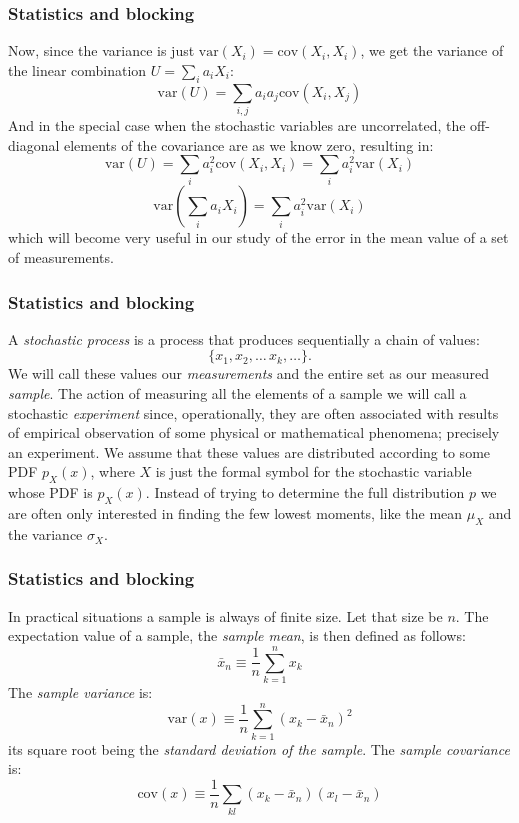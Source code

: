 \documentclass{beamer}
\begin{document}
\begin{frame}
\frametitle{Statistics and blocking}

\begin{block}{}
Now, since the variance is just $\mathrm{var}(X_i) = \mathrm{cov}(X_i, X_i)$, we get
the variance of the linear combination $U = \sum_i a_i X_i$:
\begin{equation}
\mathrm{var}(U) = \sum_{i,j}a_i a_j \mathrm{cov}(X_i, X_j)
\label{eq:variance_linear_combination}
\end{equation}
And in the special case when the stochastic variables are
uncorrelated, the off-diagonal elements of the covariance are as we
know zero, resulting in:
\[
\mathrm{var}(U) = \sum_i a_i^2 \mathrm{cov}(X_i, X_i) = \sum_i a_i^2 \mathrm{var}(X_i)
\]
\[
\mathrm{var}(\sum_i a_i X_i) = \sum_i a_i^2 \mathrm{var}(X_i)
\]
which will become very useful in our study of the error in the mean
value of a set of measurements.
\end{block}
\end{frame}

\begin{frame}
\frametitle{Statistics and blocking}

\begin{block}{}
A \emph{stochastic process} is a process that produces sequentially a
chain of values:
\[
\{x_1, x_2,\dots\,x_k,\dots\}.
\]
We will call these
values our \emph{measurements} and the entire set as our measured
\emph{sample}.  The action of measuring all the elements of a sample
we will call a stochastic \emph{experiment} since, operationally,
they are often associated with results of empirical observation of
some physical or mathematical phenomena; precisely an experiment. We
assume that these values are distributed according to some 
PDF $p_X^{\phantom X}(x)$, where $X$ is just the formal symbol for the
stochastic variable whose PDF is $p_X^{\phantom X}(x)$. Instead of
trying to determine the full distribution $p$ we are often only
interested in finding the few lowest moments, like the mean
$\mu_X^{\phantom X}$ and the variance $\sigma_X^{\phantom X}$.
\end{block}
\end{frame}

\begin{frame}
\frametitle{Statistics and blocking}

\begin{block}{}
In practical situations a sample is always of finite size. Let that
size be $n$. The expectation value of a sample, the \emph{sample mean}, is then defined as follows:
\[
\bar{x}_n \equiv \frac{1}{n}\sum_{k=1}^n x_k
\]
The \emph{sample variance} is:
\[
\mathrm{var}(x) \equiv \frac{1}{n}\sum_{k=1}^n (x_k - \bar{x}_n)^2
\]
its square root being the \emph{standard deviation of the sample}. The
\emph{sample covariance} is:
\[
\mathrm{cov}(x)\equiv\frac{1}{n}\sum_{kl}(x_k - \bar{x}_n)(x_l - \bar{x}_n)
\]
\end{block}
\end{frame}
\end{document}
